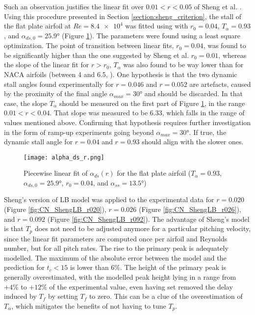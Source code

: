 Such an observation justifies the linear fit over $0.01<r<0.05$ of Sheng et al. \cite{sheng_new_2006}. Using this procedure presented in Section \ref{section:sheng_criterion}, the stall of the flat plate airfoil at $Re=\num{8.4e4}$ was fitted using with $r_0=0.04$, $T_\alpha=0.93$, and $\alpha_{ds,0}=\ang{25.9}$ (Figure  \ref{fig:alpha_ds_r}). The parameters were found using a least square optimization. The point of transition between linear fits, $r_0=0.04$, was found to be significantly higher than the one suggested by Sheng et al. $r_0=0.01$, whereas the slope of the linear fit for $r>r_0$, $T_\alpha$ was also found to be way lower than for NACA airfoils (between 4 and 6.5, \cite{sheng_new_2006}). One hypothesis is that the two dynamic stall angles found experimentally for $r=0.046$ and $r=0.052$ are artefacts, caused by the proximity of the final angle $\alpha_{max}=\ang{30}$ and should be discarded. In that case, the slope $T_\alpha$ should be measured on the first part of Figure \ref{fig:alpha_ds_r}, in the range $0.01<r<0.04$. That slope was measured to be 6.33, which falls in the range of values mentioned above. Confirming that hypothesis requires further investigation in the form of ramp-up experiments going beyond $\alpha_{max}=\ang{30}$. If true, the dynamic stall angle for $r=0.04$ and $r=0.93$ should align with the slower ones. 

\begin{figure}[h]
    \centering
    \texttt{[image: alpha\_ds\_r.png]}
    \caption{Piecewise linear fit of $\alpha_{ds}(r)$ for the flat plate airfoil ($T_\alpha = 0.93$, $\alpha_{ds,0}=\ang{25.9}$, $r_0=0.04$, and $\alpha_{ss}=\ang{13.5}$)}
    \label{fig:alpha_ds_r}
\end{figure}

Sheng's version of LB model was applied to the experimental data for $r=0.020$ (Figure \ref{fig:CN_ShengLB_r020}), $r=0.026$ (Figure \ref{fig:CN_ShengLB_r026}), and $r=0.092$ (Figure \ref{fig:CN_ShengLB_r092}). The advantage of Sheng's model is that $T_p$ does not need to be adjusted anymore for a particular pitching velocity, since the linear fit parameters are computed once per airfoil and Reynolds number, but for all pitch rates. 
The rise to the primary peak is adequately modelled. The maximum of the absolute error between the model and the prediction for $t_c<15$ is lower than 6\%. 
The height of the primary peak is generally overestimated, with the modelled peak height lying in a range from $+4\%$ to $+12\%$ of the experimental value, even having set removed the delay induced by $T_f$ by setting $T_f$ to zero. This can be a clue of the overestimation of $T_\alpha$, which mitigates the benefits of not having to tune $T_p$.

